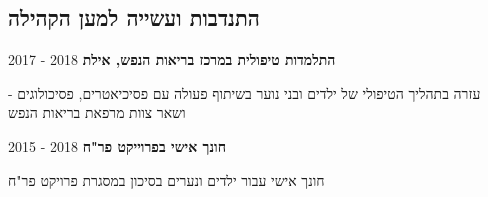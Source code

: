 \documentclass[
	11pt,a4paper %
]{article}
\begin{document}
\begin{hebrew}
\begin{paracol}{2}
\section{התנדבות ועשייה למען הקהילה}

\textbf{התלמדות טיפולית במרכז בריאות הנפש, אילת} \hfill 2018 - 2017

- עזרה בתהליך הטיפולי של ילדים ובני נוער בשיתוף פעולה עם פסיכיאטרים, פסיכולוגים ושאר צוות מרפאת בריאות הנפש

\textbf{חונך אישי בפרוייקט פר"ח} \hfill 2018 - 2015

חונך אישי עבור ילדים ונערים בסיכון במסגרת פרויקט פר"ח


\end{paracol} %
\end{hebrew}
\unsetRTL
\end{document}
